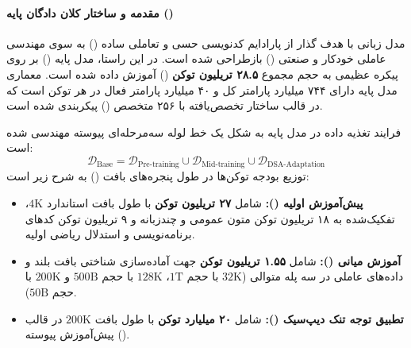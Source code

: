 \item {}

\paragraph*{مقدمه و ساختار کلان دادگان پایه ()}
مدل زبانی  \cite{glm5team2026} با هدف گذار از پارادایم کدنویسی حسی و تعاملی ساده () به سوی مهندسی عاملی خودکار و صنعتی () بازطراحی شده است. در این راستا، مدل پایه () بر روی پیکره عظیمی به حجم مجموع \textbf{۲۸.۵ تریلیون توکن} () آموزش داده شده است. معماری مدل پایه دارای ۷۴۴ میلیارد پارامتر کل و ۴۰ میلیارد پارامتر فعال در هر توکن است که در قالب ساختار تخصص‌یافته با ۲۵۶ متخصص () پیکربندی شده است.

فرایند تغذیه داده در مدل پایه  به شکل یک خط لوله سه‌مرحله‌ای پیوسته مهندسی شده است:
\begin{equation}
    \mathcal{D}_{\text{Base}} = \mathcal{D}_{\text{Pre-training}} \cup \mathcal{D}_{\text{Mid-training}} \cup \mathcal{D}_{\text{DSA-Adaptation}}
\end{equation}
توزیع بودجه توکن‌ها در طول پنجره‌های بافت () به شرح زیر است:
\begin{itemize}
    \item \textbf{پیش‌آموزش اولیه ():} شامل \textbf{۲۷ تریلیون توکن} با طول بافت استاندارد $4\text{K}$، تفکیک‌شده به ۱۸ تریلیون توکن متون عمومی و چندزبانه و ۹ تریلیون توکن کدهای برنامه‌نویسی و استدلال ریاضی اولیه.
    \item \textbf{آموزش میانی ():} شامل \textbf{۱.۵۵ تریلیون توکن} جهت آماده‌سازی شناختی بافت بلند و داده‌های عاملی در سه پله متوالی ($32\text{K}$ با حجم $1\text{T}$، $128\text{K}$ با حجم $500\text{B}$ و $200\text{K}$ با حجم $50\text{B}$).
    \item \textbf{تطبیق توجه تنک دیپ‌سیک ():} شامل \textbf{۲۰ میلیارد توکن} با طول بافت $200\text{K}$ در قالب پیش‌آموزش پیوسته ().
\end{itemize}

